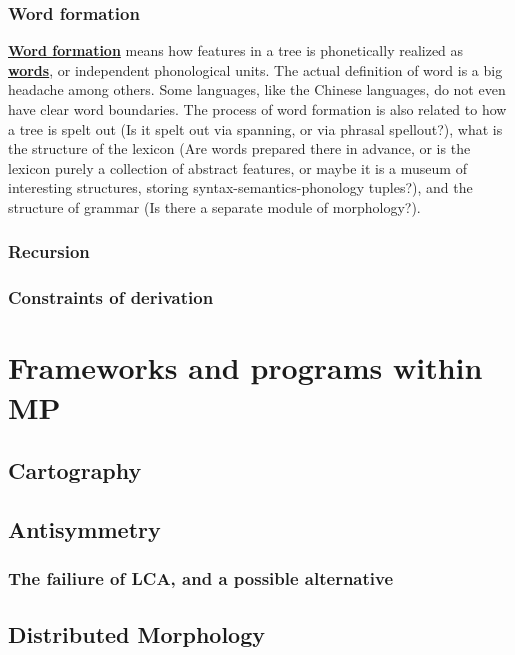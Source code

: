 \documentclass[a4paper]{article}
\newcommand*{\concept}[1]{\underline{\textbf{#1}}}
\begin{document}
\subsubsection{Word formation}

\concept{Word formation} means how features in a tree is phonetically realized as \concept{words}, or independent phonological units.
The actual definition of word is a big headache among others.
Some languages, like the Chinese languages, do not even have clear word boundaries.
The process of word formation is also related to how a tree is spelt out (Is it spelt out via spanning, or via phrasal spellout?), what is the structure of the lexicon (Are words prepared there in advance, or is the lexicon purely a collection of abstract features, or maybe it is a museum of interesting structures, storing syntax-semantics-phonology tuples?), and the structure of grammar (Is there a separate module of morphology?).

\subsubsection{Recursion}



\subsubsection{Constraints of derivation}



\section{Frameworks and programs within MP}\label{sec:framework}

\subsection{Cartography}

\subsection{Antisymmetry}

\subsubsection{The failiure of LCA, and a possible alternative}

\subsection{Distributed Morphology}
\end{document}
